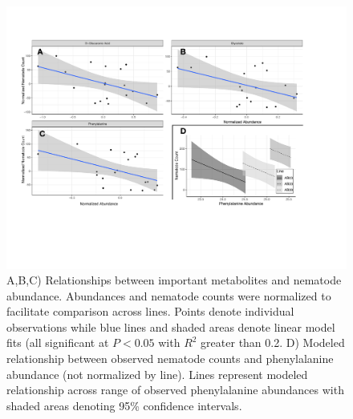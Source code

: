 \documentclass[9pt,lineno]{elife}
\begin{document}
\begin{figure}
\includegraphics[width = 0.95\linewidth]{figures/publication_figures/figure-5.pdf}
\caption{A,B,C) Relationships between important metabolites and nematode abundance.  Abundances and nematode counts were normalized to facilitate comparison across lines.  Points denote individual observations while blue lines and shaded areas denote linear model fits (all significant at $P < 0.05$ with $R^2$ greater than 0.2.  D) Modeled relationship between observed nematode counts and phenylalanine abundance (not normalized by line).  Lines represent modeled relationship across range of observed phenylalanine abundances with shaded areas denoting 95\% confidence intervals. }
\label{fig:figure5}
\end{figure}
\end{document}
